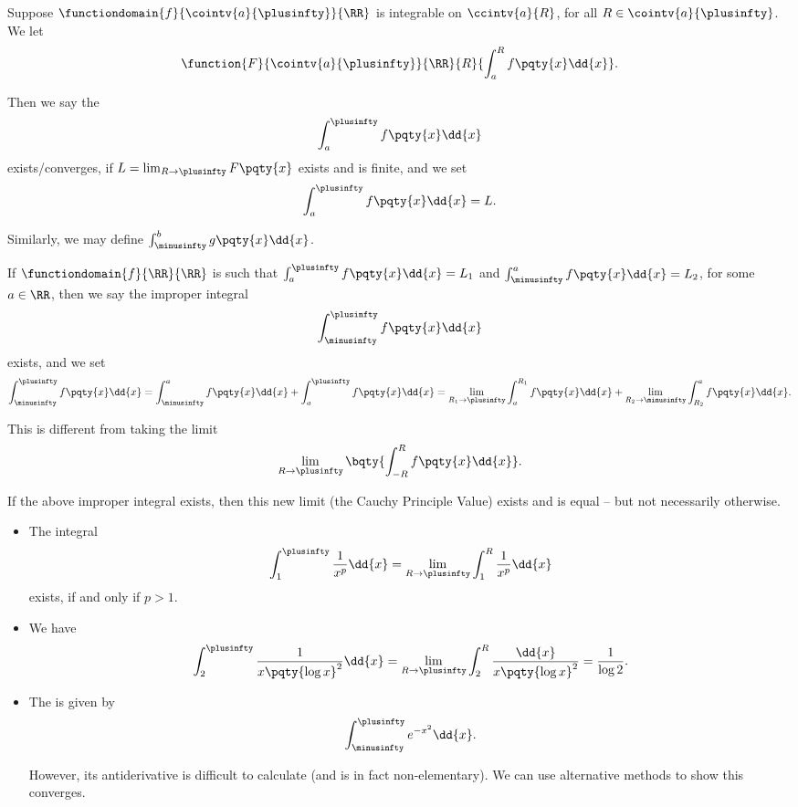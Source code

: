\begin{definition}
    Suppose \(\functiondomain{f}{\cointv{a}{\plusinfty}}{\RR}\) is integrable on \(\ccintv{a}{R}\), for all \(R \in \cointv{a}{\plusinfty}\). We let
    \[
        \function{F}{\cointv{a}{\plusinfty}}{\RR}{R}{\int_{a}^{R} f\pqty{x} \dd{x}}.
    \]

    Then we say the 
    \[
        \int_{a}^{\plusinfty} f\pqty{x} \dd{x}
    \]
    exists/converges, if \(L = \lim_{R \to \plusinfty} F\pqty{x}\) exists and is finite, and we set
    \[
        \int_{a}^{\plusinfty} f\pqty{x} \dd{x} = L.
    \]

    Similarly, we may define \(\int_{\minusinfty}^{b} g\pqty{x} \dd{x}\).

    If \(\functiondomain{f}{\RR}{\RR}\) is such that \(\int_{a}^{\plusinfty} f\pqty{x} \dd{x} = L_1\) and \(\int_{\minusinfty}^{a} f\pqty{x} \dd{x} = L_2\), for some \(a \in \RR\), then we say the improper integral
    \[
        \int_{\minusinfty}^{\plusinfty} f\pqty{x} \dd{x}
    \]
    exists, and we set
    \[
        \int_{\minusinfty}^{\plusinfty} f\pqty{x} \dd{x} = \int_{\minusinfty}^{a} f\pqty{x} \dd{x} + \int_{a}^{\plusinfty} f\pqty{x} \dd{x} = \lim_{R_1 \to \plusinfty} \int_{a}^{R_1} f\pqty{x} \dd{x} + \lim_{R_2 \to \minusinfty} \int_{R_2}^{a} f\pqty{x} \dd{x}.
    \]
\end{definition}

\begin{remark}
    This is different from taking the limit
    \[
        \lim_{R \to \plusinfty} \bqty{\int_{-R}^{R} f\pqty{x} \dd{x}}.
    \]

    If the above improper integral exists, then this new limit (the Cauchy Principle Value) exists and is equal -- but not necessarily otherwise.
\end{remark}

\begin{examples}
    \label{ex:improper-integrals-unbounded-intervals}%
    \begin{itemize}
        \item The integral
        \[
            \int_{1}^{\plusinfty} \frac{1}{x^p} \dd{x} = \lim_{R \to \plusinfty} \int_{1}^{R} \frac{1}{x^p} \dd{x}
        \]
        exists, if and only if \(p > 1\).

        \item We have
        \[
            \int_{2}^{\plusinfty} \frac{1}{x \pqty{\log x}^2} \dd{x} = \lim_{R \to \plusinfty} \int_{2}^{R} \frac{\dd{x}}{x \pqty{\log x}^2} = \frac{1}{\log 2}.
        \]

        \item The  is given by
        \[
            \int_{\minusinfty}^{\plusinfty} e^{- x^2} \dd{x}.
        \]

        However, its antiderivative is difficult to calculate (and is in fact non-elementary). We can use alternative methods to show this converges.
    \end{itemize}
\end{examples}

